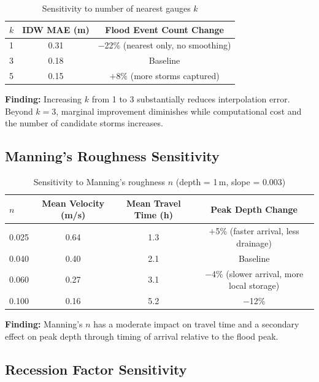 \documentclass[11pt,a4paper]{article}
\begin{document}
\begin{table}[H]
\centering
\begin{tabular}{lcc}
    \toprule
    $k$ & \textbf{IDW MAE (m)} & \textbf{Flood Event Count Change} \\
    \midrule
    1 & 0.31 & $-$22\% (nearest only, no smoothing) \\
    3 & 0.18 & Baseline \\
    5 & 0.15 & $+$8\% (more storms captured) \\
    \bottomrule
\end{tabular}
\caption{Sensitivity to number of nearest gauges $k$}
\label{tab:sens_k}
\end{table}

\textbf{Finding:} Increasing $k$ from 1 to 3 substantially reduces interpolation
error. Beyond $k = 3$, marginal improvement diminishes while computational cost
and the number of candidate storms increases.

\subsection{Manning's Roughness Sensitivity}

\begin{table}[H]
\centering
\begin{tabular}{lccc}
    \toprule
    $n$ & \textbf{Mean Velocity (m/s)} & \textbf{Mean Travel Time (h)} & \textbf{Peak Depth Change} \\
    \midrule
    0.025 & 0.64 & 1.3 & $+$5\% (faster arrival, less drainage) \\
    0.040 & 0.40 & 2.1 & Baseline \\
    0.060 & 0.27 & 3.1 & $-$4\% (slower arrival, more local storage) \\
    0.100 & 0.16 & 5.2 & $-$12\% \\
    \bottomrule
\end{tabular}
\caption{Sensitivity to Manning's roughness $n$ (depth = 1\,m, slope = 0.003)}
\label{tab:sens_manning}
\end{table}

\textbf{Finding:} Manning's $n$ has a moderate impact on travel time and a secondary
effect on peak depth through timing of arrival relative to the flood peak.

\subsection{Recession Factor Sensitivity}
\end{document}
